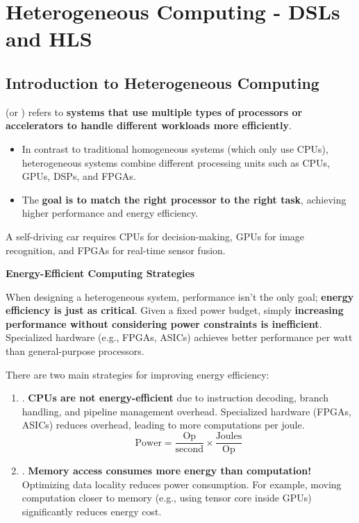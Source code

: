 \section{Heterogeneous Computing - DSLs and HLS}

\subsection{Introduction to Heterogeneous Computing}

 (or ) refers to \textbf{systems that use multiple types of processors or accelerators to handle different workloads more efficiently}.
\begin{itemize}
    \item In contrast to traditional homogeneous systems (which only use CPUs), heterogeneous systems combine different processing units such as CPUs, GPUs, DSPs, and FPGAs.
    \item The \textbf{goal is to match the right processor to the right task},  achieving higher performance and energy efficiency.  
\end{itemize}

\begin{examplebox}
    A self-driving car requires CPUs for decision-making, GPUs for image recognition, and FPGAs for real-time sensor fusion.
\end{examplebox}

\highspace
\begin{flushleft}
    \textcolor{Green3}{\faIcon{\speedIcon} \textbf{Energy-Efficient Computing Strategies}}
\end{flushleft}
When designing a heterogeneous system, performance isn't the only goal; \textbf{energy efficiency is just as critical}. Given a fixed power budget, simply \textbf{increasing performance without considering power constraints is inefficient}. Specialized hardware (e.g., FPGAs, ASICs) achieves better performance per watt than general-purpose processors.

\highspace
There are two main strategies for improving energy efficiency:
\begin{enumerate}
    \item {}. \textbf{CPUs are not energy-efficient} due to instruction decoding, branch handling, and pipeline management overhead. Specialized hardware (FPGAs, ASICs) reduces overhead, leading to more computations per joule.
    \begin{equation*}
        \text{Power} = \dfrac{\text{Op}}{\text{second}} \times \dfrac{\text{Joules}}{\text{Op}}
    \end{equation*} 
    \item {}. \textbf{Memory access consumes more energy than computation!} Optimizing data locality reduces power consumption. For example, moving computation closer to memory (e.g., using tensor core inside GPUs) significantly reduces energy cost.
\end{enumerate}
